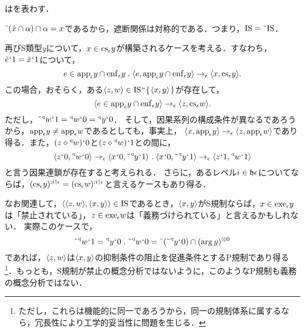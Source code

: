 \begin{df}
\label{df:遮断関係}
はを表わす．
\end{df}

\noindent $ \bar{\:\:}(\bar{x}\cap\alpha)\cap\alpha = x $であるから，遮断関係は対称的である．つまり，$ \mathrm{IS}=\breve{\:\:}\mathrm{IS} $．

再びS類型$y$について，$ x\in\mathrm{cs}_{\epsilon}y $が構築されるケースを考える．すなわち，$ \tilde{e}{\mspace{1mu}{`}\mspace{1mu}} 1 = \tilde{x}{\mspace{1mu}{`}\mspace{1mu}} 1 $について，
\[
    e\in\app{\epsilon} y\cap\enf{\epsilon}y\con{1}
    \orp{e,\app{\epsilon} y\cap\enf{\epsilon}y}\to_{\epsilon}\orp{x,\cs{\epsilon}y}.
\]
この場合，おそらく，ある$ \langle z,w \rangle\in\mathrm{IS}{\mspace{1mu}{``}\mspace{1mu}}\{\mspace{2mu}\langle x,y \rangle\mspace{2mu}\} $が存在して，
\[
    \langle e\in\mathrm{app}_{\epsilon} y\cap\mathrm{enf}_{\epsilon}y \rangle\to_{\epsilon}\langle z,\mathrm{cs}_{\epsilon}w \rangle.
\]
ただし，$ \tilde{\:\:}{^\triangleleft}w{\mspace{1mu}{`}\mspace{1mu}} 1 = {^\triangleleft}w{\mspace{1mu}{`}\mspace{1mu}} 0 = {^\triangleleft}y{\mspace{1mu}{`}\mspace{1mu}} 0 $．
そして，因果系列の構成条件が異なるであろうから，$ \mathrm{app}_{\epsilon} y \neq \mathrm{app}_{\epsilon} w $であるとしても，事実上，
$ \langle x,\mathrm{app}_{\epsilon} y \rangle\to_{\epsilon}\langle z,\mathrm{app}_{\epsilon} w \rangle $であり得る．また，$ (z\diamond{^\triangleleft}w){\mspace{1mu}{`}\mspace{1mu}} 0 $と$ (z\diamond{^\triangleleft}w){\mspace{1mu}{`}\mspace{1mu}} 1 $との間に，
\[
   \orp{z\fap 0,\trgl{w}\fap 0}\to_{\epsilon}\orp{x\fap 0,\tildel{\trgl{y}}\fap 1}\con{1}
    \orp{x\fap 0,\tildel{\trgl{y}}\fap 1}\to_{\epsilon}\orp{z\fap 1,\trgl{w}\fap 1}
\]
と言う因果連鎖が存在すると考えられる．
さらに，あるレベル$ i\in\mathfrak{h}\epsilon $についてならば，$ (\mathrm{cs}_{\epsilon}y)^{:i\mathbin{\upharpoonleft}\epsilon} = (\mathrm{cs}_{\epsilon}w)^{:i\mathbin{\upharpoonleft}\epsilon} $と言えるケースもあり得る．

なお関連して，$ \langle \langle z,w \rangle,\langle x,y \rangle \rangle\in\mathrm{IS} $であるとき，$ \langle x,y \rangle $がS規制ならば，$ x\in\mathrm{exe}_{\epsilon} y $は「禁止されている」，$ z\in\mathrm{exe}_{\epsilon} w $は「義務づけられている」と言えるかもしれない．
実際このケースで，
\[
    \tildel{\trgl{w}}\fap 1 = \trgl{y}\fap 0\con{1}
    \tildel{\trgl{w}}\fap 0 = \barl{(\tildel{\trgl{y}}\fap 0)}\cap\mser{(\arg y)}{0}
\]
であれば，$ \langle z,w \rangle $は$ \langle x,y \rangle $の抑制条件の阻止を促進条件とするP規制であり得る\footnote{
    ただし，これらは機能的に同一であろうから，同一の規制体系に属するなら，冗長性により工学的妥当性に問題を生じる．
}．もっとも，S規制が禁止の概念分析ではないように，このようなP規制も義務の概念分析ではない．

